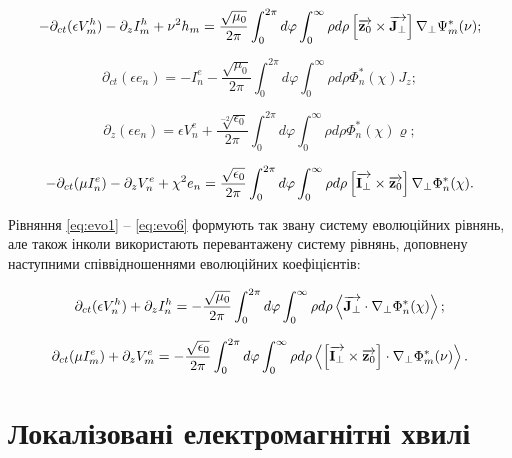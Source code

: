 \begin{equation} \label{eq:evo3}
- \partial_{ct} (\epsilon V_m^h) - \partial_z I_m^h + \nu^2 h_m = 
\frac{\sqrt{\mu_0}}{2 \pi} \int_0^{2\pi} d \varphi 
\int_0^{\infty} \rho d \rho \left[ \overrightarrow{\mathbf z_0} \times \overrightarrow{\mathbf J_\perp} \right]
\nabla_\perp \Psi_m^* (\nu);
\end{equation}

\begin{equation} \label{eq:evo4}
\partial_{ct} (\epsilon e_n) = - I_n^e - 
\frac{\sqrt{\mu_0}}{2 \pi} \int_0^{2\pi} d \varphi 
\int_0^{\infty} \rho d \rho \Phi_n^* (\chi) J_z;
\end{equation}

\begin{equation} \label{eq:evo5}
\partial_{z} (\epsilon e_n) = \epsilon V_n^e + 
\frac{\sqrt[-2]{\epsilon_0}}{2 \pi} \int_0^{2\pi} d \varphi 
\int_0^{\infty} \rho d \rho \Phi_n^* (\chi) \varrho;
\end{equation}

\begin{equation} \label{eq:evo6}
- \partial_{ct}(\mu I_n^e) - \partial_z V_n^e + \chi^2 e_n = 
\frac{\sqrt{\epsilon_0}}{2 \pi} \int_0^{2\pi} d \varphi 
\int_0^{\infty} \rho d \rho \left[ \overrightarrow{\mathbf I_\perp} \times \overrightarrow{\mathbf z_0} \right]
\nabla_\perp \Phi_n^* (\chi).
\end{equation}

Рівняння \eqref{eq:evo1} -- \eqref{eq:evo6} формують так звану систему 
еволюційних рівнянь, але також інколи використають перевантажену систему 
рівнянь, доповнену наступними співвідношеннями еволюційних коефіцієнтів:

\begin{equation}
\partial_{ct} (\epsilon V_n^h) + \partial_z I_n^h = 
- \frac{\sqrt{\mu_0}}{2 \pi} \int_0^{2\pi} d \varphi 
\int_0^{\infty} \rho d \rho 
\left< \overrightarrow{\mathbf J_\perp} \cdot \nabla_\perp \Phi_n^* (\chi) \right>;
\end{equation}

\begin{equation}
\partial_{ct}(\mu I_m^e) + \partial_z V_m^e = - 
\frac{\sqrt{\epsilon_0}}{2 \pi} \int_0^{2\pi} d \varphi 
\int_0^{\infty} \rho d \rho 
\left< \left[ \overrightarrow{\mathbf I_\perp} \times \overrightarrow{\mathbf z_0} \right]  \cdot  \nabla_\perp \Phi_m^* (\nu)  \right>.
\end{equation}

\section{Локалізовані електромагнітні хвилі}

